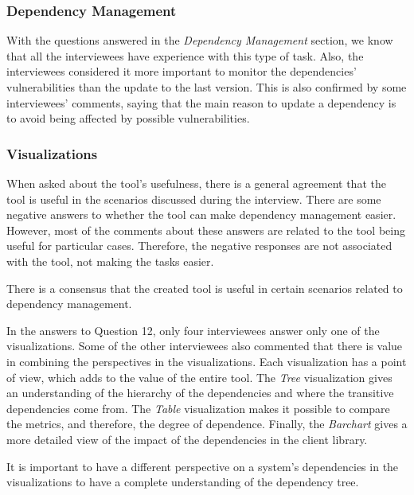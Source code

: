 \subsubsection{Dependency Management}
With the questions answered in the \textit{Dependency Management} section, we know that all the interviewees have experience with this type of task. Also, the interviewees considered it more important to monitor the dependencies' vulnerabilities than the update to the last version. This is also confirmed by some interviewees' comments, saying that the main reason to update a dependency is to avoid being affected by possible vulnerabilities. 


\subsubsection{Visualizations}
When asked about the tool's usefulness, there is a general agreement that the tool is useful in the scenarios discussed during the interview. There are some negative answers to whether the tool can make dependency management easier. However, most of the comments about these answers are related to the tool being useful for particular cases. Therefore, the negative responses are not associated with the tool, not making the tasks easier.

\begin{finding}
	There is a consensus that the created tool is useful in certain scenarios related to dependency management.
	\label{find:tool-useful}
\end{finding}

In the answers to Question 12, only four interviewees answer only one of the visualizations. Some of the other interviewees also commented that there is value in combining the perspectives in the visualizations. Each visualization has a point of view, which adds to the value of the entire tool. The \textit{Tree} visualization gives an understanding of the hierarchy of the dependencies and where the transitive dependencies come from. The \textit{Table} visualization makes it possible to compare the metrics, and therefore, the degree of dependence. Finally, the \textit{Barchart} gives a more detailed view of the impact of the dependencies in the client library.

\begin{finding}
	It is important to have a different perspective on a system's dependencies in the visualizations to have a complete understanding of the dependency tree.
	\label{find:different-perspectives}
\end{finding}

